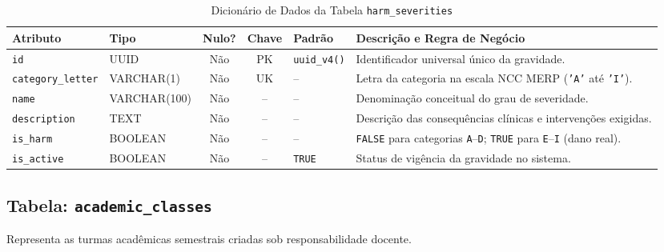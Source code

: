\begin{table}[!ht]
\centering
\caption{Dicionário de Dados da Tabela \texttt{harm\_severities}}
\label{tab_dic_harm_severities}
\footnotesize
\begin{tabularx}{\textwidth}{p{3.2cm} p{2.5cm} c c p{1.8cm} X}
\toprule
\textbf{Atributo} & \textbf{Tipo} & \textbf{Nulo?} & \textbf{Chave} & \textbf{Padrão} & \textbf{Descrição e Regra de Negócio} \\
\midrule
\texttt{id} & UUID & Não & PK & \texttt{uuid\_v4()} & Identificador universal único da gravidade. \\
\texttt{category\_\-letter} & VARCHAR(1) & Não & UK & -- & Letra da categoria na escala NCC MERP (\texttt{'A'} até \texttt{'I'}). \\
\texttt{name} & VARCHAR(100) & Não & -- & -- & Denominação conceitual do grau de severidade. \\
\texttt{description} & TEXT & Não & -- & -- & Descrição das consequências clínicas e intervenções exigidas. \\
\texttt{is\_harm} & BOOLEAN & Não & -- & -- & \texttt{FALSE} para categorias \texttt{A}--\texttt{D}; \texttt{TRUE} para \texttt{E}--\texttt{I} (dano real). \\
\texttt{is\_active} & BOOLEAN & Não & -- & \texttt{TRUE} & Status de vigência da gravidade no sistema. \\
\bottomrule
\end{tabularx}
\end{table}

\subsection{Tabela: \texttt{academic\_classes}}
Representa as turmas acadêmicas semestrais criadas sob responsabilidade docente.

